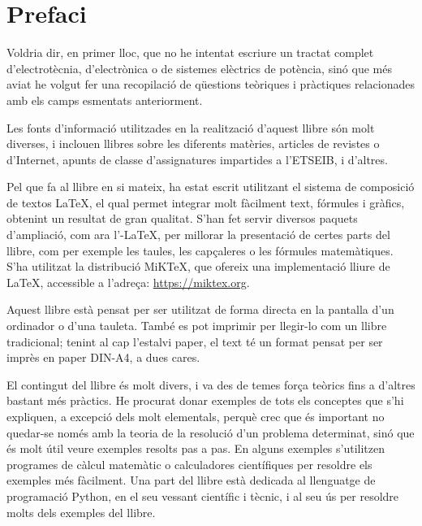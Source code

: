 \chapter*{Prefaci} 

   Voldria dir, en primer lloc, que no he intentat escriure un tractat complet
   d'electrotècnia, d'electrònica o de sistemes elèctrics de potència, sinó que més aviat
   he volgut
   fer una recopilació de qüestions teòriques i pràctiques relacionades amb els camps esmentats
   anteriorment.

   Les fonts d'informació utilitzades en la realització d'aquest llibre són molt diverses,
   i inclouen llibres sobre les diferents matèries, articles de revistes o d'Internet,
   apunts de classe d'assignatures impartides a l'ETSEIB, i d'altres.

   Pel que fa al llibre en si mateix, ha estat escrit utilitzant el sistema de composició de
   textos \LaTeX, el qual
   permet integrar molt fàcilment text, fórmules i gràfics, obtenint un resultat de
   gran qualitat. S'han fet servir diversos paquets d'ampliació, com ara
   l'\AmS-\LaTeX,
   per millorar la presentació de certes parts del
   llibre, com per exemple les taules, les capçaleres o les fórmules matemàtiques. S'ha utilitzat la distribució MiK\TeX, que ofereix una implementació lliure de \LaTeX{}, accessible a l'adreça: \href{https://miktex.org/}{https:/\!\!/miktex.org}.

   Aquest llibre està pensat per  ser utilitzat  de forma directa en la pantalla d'un
   ordinador o d'una tauleta. També es pot imprimir per  llegir-lo com un llibre tradicional;  tenint al cap l'estalvi paper, el text
   té un format pensat per  ser imprès en paper DIN-A4, a dues cares.

    El contingut del llibre és molt divers, i va des de temes força teòrics fins a
    d'altres bastant més pràctics. He procurat donar exemples de tots els conceptes
    que s'hi expliquen, a excepció dels molt elementals, perquè crec que és important
     no quedar-se només amb la teoria de  la resolució d'un problema determinat, sinó que
     és molt útil veure exemples resolts pas a pas. En alguns exemples s'utilitzen programes de càlcul matemàtic o calculadores científiques per  resoldre els exemples més fàcilment. Una part  del llibre està dedicada al llenguatge de programació Python, en el seu vessant científic i tècnic, i al seu ús  per resoldre molts dels exemples del llibre.
     
